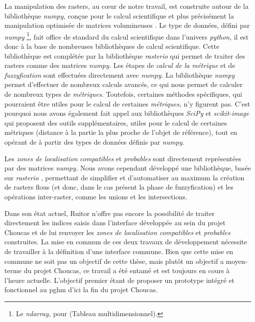 La manipulation des rasters, au cœur de notre travail, est construite
autour de la bibliothèque \emph{numpy,} conçue pour le calcul
scientifique et plus précisément la manipulation optimisée de matrices
volumineuses \autocite{vanderWalt2011}. Le type de données, défini par
\emph{numpy} \footnote{Le \emph{ndarray,} pour
   (Tableau
  multidimensionnel).}, fait office de standard du calcul scientifique
dans l'univers \emph{python,} il est donc à la base de nombreuses
bibliothèques de calcul scientifique. Cette bibliothèque est complétée
par la bibliothèque \emph{rasterio} \autocite{Mapbox2020} qui permet
de traiter des rasters comme des matrices \emph{numpy.} Les étapes de
\emph{calcul de la métrique} et de \emph{fuzzyfication} sont
effectuées directement avec \emph{numpy.} La bibliothèque \emph{numpy}
permet d'effectuer de nombreux calculs avancés, ce qui nous permet de
calculer de nombreux types de \emph{métriques.} Toutefois, certaines
méthodes spécifiques, qui pourraient être utiles pour le calcul de
certaines \emph{métriques,} n'y figurent pas. C'est pourquoi nous
avons également fait appel aux bibliothèques \emph{SciPy} et
\emph{scikit-image} \autocite{vanderWalt2014,Virtanen2020} qui
proposent des outils supplémentaires, utiles pour le calcul de
certaines métriques (\eg distance à la partie la plus proche de
l'objet de référence), tout en opérant de à partir des types de
données définis par \emph{numpy.}

Les \emph{zones de localisation} \emph{compatibles} et
\emph{probables} sont directement représentées par des matrices
\emph{numpy.} Nous avons cependant développé une bibliothèque, basée
sur \emph{rasterio} \autocite{Mapbox2020}, permettant de simplifier et
d'automatiser au maximum la création de rasters flous (et donc, dans
le cas présent la phase de fuzzyfication) et les opérations
inter-raster, comme les unions et les intersections.

Dans son état actuel, Ruitor n'offre pas encore la possibilité de
traiter directement les indices saisis dans l'interface développée au
sein du projet Choucas \autocite{Viry2019a} et de lui renvoyer les
\emph{zones de localisation compatibles} et \emph{probables}
construites. La mise en commun de ces deux travaux de développement
nécessite de travailler à la définition d'une interface commune. Bien
que cette mise en commune ne soit pas un objectif de cette thèse, mais
plutôt un objectif a moyen-terme du projet Choucas, ce travail a été
entamé et est toujours en cours à l'heure actuelle. L'objectif premier
étant de proposer un prototype intégré et fonctionnel au \ac{pghm}
d'ici la fin du projet Choucas.

